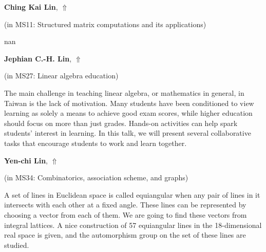 \documentclass[ILAS2025-program.tex]{subfiles}
\begin{document}
\hypertarget{down0236}{}\begin{ilasabstract}
    
\textbf{Ching Kai Lin},  \hfill \hyperlink{up0236}{$\Uparrow$}
    
    
(in {\color{mstitle}MS11: Structured matrix computations and its applications})
        
\mtskip
    nan
\end{ilasabstract}
    

\hypertarget{down0261}{}\begin{ilasabstract}
    
\textbf{Jephian C.-H. Lin},  \hfill \hyperlink{up0261}{$\Uparrow$}
    
    
(in {\color{mstitle}MS27: Linear algebra education})
        
\mtskip
    The main challenge in teaching linear algebra, or mathematics in general, in Taiwan is the lack of motivation. Many students have been conditioned to view learning as solely a means to achieve good exam scores, while higher education should focus on more than just grades. Hands-on activities can help spark students' interest in learning. In this talk, we will present several collaborative tasks that encourage students to work and learn together.

\end{ilasabstract}
    

\hypertarget{down0324}{}\begin{ilasabstract}
    
\textbf{Yen-chi Lin},  \hfill \hyperlink{up0324}{$\Uparrow$}
    
    
(in {\color{mstitle}MS34: Combinatorics, association scheme, and graphs})
        
\mtskip
    A set of lines in Euclidean space is called equiangular when any pair of lines in it intersects with each other at a fixed angle.
These lines can be represented by choosing a vector from each of them.
We are going to find these vectors from integral lattices.
A nice construction of 57 equiangular lines in the 18-dimensional real space is given, and the automorphism group on the set of these lines are studied.

\end{ilasabstract}
    
\end{document}
